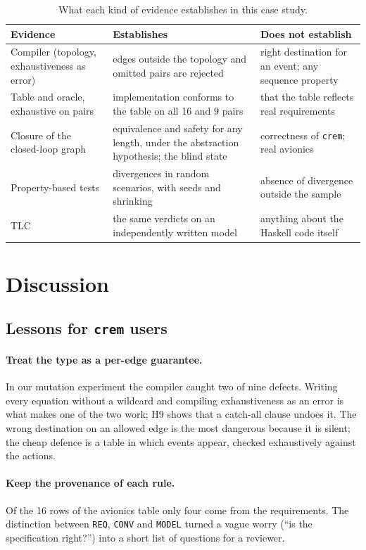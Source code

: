 \documentclass[review]{jfp-epi}
\newcommand{\crem}{\texttt{crem}}
\begin{document}
\begin{table}[t]
\caption{What each kind of evidence establishes in this case study.}
\label{tab:evidence}
\small
\begin{tabular}{@{}p{3.1cm}p{4.5cm}p{4.2cm}@{}}
\toprule
Evidence & Establishes & Does not establish \\
\midrule
Compiler (topology, exhaustiveness as error) & edges outside the topology and omitted pairs are rejected & right destination for an event; any sequence property \\
Table and oracle, exhaustive on pairs & implementation conforms to the table on all 16 and 9 pairs & that the table reflects real requirements \\
Closure of the closed-loop graph & equivalence and safety for any length, under the abstraction hypothesis; the blind state & correctness of \crem{}; real avionics \\
Property-based tests & divergences in random scenarios, with seeds and shrinking & absence of divergence outside the sample \\
TLC & the same verdicts on an independently written model & anything about the Haskell code itself \\
\bottomrule
\end{tabular}
\end{table}

\section{Discussion}
\label{sec:discussion}

\subsection{Lessons for \crem{} users}

\paragraph{Treat the type as a per-edge guarantee.} In our mutation experiment the compiler caught two of nine defects. Writing every equation without a wildcard and compiling exhaustiveness as an error is what makes one of the two work; H9 shows that a catch-all clause undoes it. The wrong destination on an allowed edge is the most dangerous because it is silent; the cheap defence is a table in which events appear, checked exhaustively against the actions.

\paragraph{Keep the provenance of each rule.} Of the 16 rows of the avionics table only four come from the requirements. The distinction between \texttt{REQ}, \texttt{CONV} and \texttt{MODEL} turned a vague worry (``is the specification right?'') into a short list of questions for a reviewer.
\end{document}
